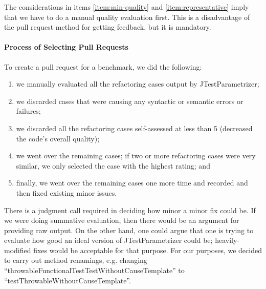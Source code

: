The considerations in items \ref{item:min-quality} and \ref{item:representative} imply that we have to do a manual quality evaluation first. This is a disadvantage of the pull request method for getting feedback, but it is mandatory.


\paragraph{Process of Selecting Pull Requests} \label{section:selection-process}

To create a pull request for a benchmark, we did the following:

 \begin{enumerate}

  \item \label{item:selecting-pr-step-one} we manually evaluated all the refactoring cases output by JTestParametrizer;

  \item \label{item:selecting-pr-step-two} we discarded cases that were causing any syntactic or semantic errors or failures;

  \item \label{item:selecting-pr-step-three} we discarded all the refactoring cases self-assessed at less than 5 (decreased the code's overall quality);
  
  \item \label{item:selecting-representative} we went over the remaining cases; if two or more refactoring cases were very similar, we only selected the case with the highest rating; and
  
  \item \label{item:minor-changes} finally, we went over the remaining cases one more time and recorded and then fixed existing minor issues.
\end{enumerate}

There is a judgment call required in deciding how minor a minor fix could be. If we were doing summative evaluation, then there would be an argument for providing raw output. On the other hand, one could argue that one is trying to evaluate how good an ideal version of JTestParametrizer could be; heavily-modified fixes would be acceptable for that purpose. For our purposes, we decided to carry out method renamings, e.g. changing ``throwableFunctionalTestTestWithoutCauseTemplate'' to ``testThrowableWithoutCauseTemplate''.



